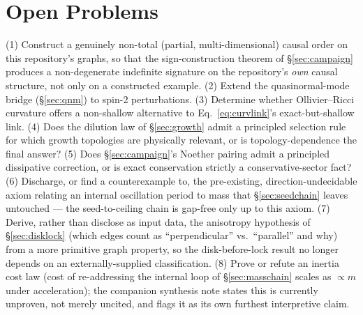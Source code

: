 \documentclass[10pt,twocolumn]{article}
\begin{document}
\section{Open Problems}
\label{sec:open}
(1) Construct a genuinely non-total (partial, multi-dimensional) causal order on this
repository's graphs, so that the sign-construction theorem of \S\ref{sec:campaign}
produces a non-degenerate indefinite signature on the repository's \emph{own} causal
structure, not only on a constructed example.
(2) Extend the quasinormal-mode bridge (\S\ref{sec:qnm}) to spin-2 perturbations.
(3) Determine whether Ollivier--Ricci curvature \cite{ollivier2009} offers a
non-shallow alternative to Eq.~\ref{eq:curvlink}'s exact-but-shallow link.
(4) Does the dilution law of \S\ref{sec:growth} admit a principled selection rule for
which growth topologies are physically relevant, or is topology-dependence the final
answer?
(5) Does \S\ref{sec:campaign}'s Noether pairing admit a principled dissipative
correction, or is exact conservation strictly a conservative-sector fact?
(6) Discharge, or find a counterexample to, the pre-existing,
direction-undecidable axiom relating an internal oscillation period to mass
that \S\ref{sec:seedchain} leaves untouched --- the seed-to-ceiling chain is
gap-free only up to this axiom.
(7) Derive, rather than disclose as input data, the anisotropy hypothesis of
\S\ref{sec:disklock} (which edges count as ``perpendicular'' vs.\ ``parallel''
and why) from a more primitive graph property, so the disk-before-lock result
no longer depends on an externally-supplied classification.
(8) Prove or refute an inertia cost law (cost of re-addressing the internal
loop of \S\ref{sec:masschain} scales as $\propto m$ under acceleration); the
companion synthesis note states this is currently unproven, not merely
uncited, and flags it as its own furthest interpretive claim.
\end{document}
